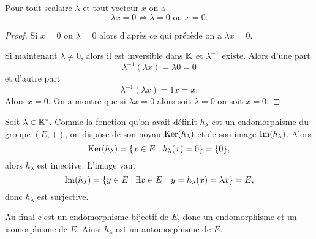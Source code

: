 \begin{prop}
  Pour tout scalaire \(\lambda\) et tout vecteur \(x\) on a
  \begin{equation}
    \lambda x = 0 \iff \lambda = 0 \text{~ou~} x=0.
  \end{equation}
\end{prop}
\begin{proof}
  Si \(x=0\) ou \(\lambda=0\) alors d'après ce qui précède on a \(\lambda x=0\).

  Si maintenant \(\lambda \neq 0\), alors il est inversible dans \(\mathbb{K}\) et 
  \(\lambda^{-1}\) existe. Alors d'une part
  \begin{equation}
    \lambda^{-1}(\lambda x)=\lambda 0 =0
  \end{equation}
  et d'autre part
  \begin{equation}
    \lambda^{-1}(\lambda x)=1 x=x.
  \end{equation}
  Alors \(x=0\). On a montré que si \(\lambda x=0\) alors soit \(\lambda=0\) ou 
  soit \(x=0\).
\end{proof}

Soit \(\lambda \in \mathbb{K}^*\). Comme la fonction qu'on avait définit \(h_\lambda\) 
est un endomorphisme du groupe \((E,+)\), on dispose de son noyau 
\(\operatorname{Ker}(h_\lambda)\) et de son image \(\operatorname{Im}(h_\lambda)\). Alors
\begin{equation}
  \operatorname{Ker}(h_\lambda)=\left\{x \in E\mathrel{}\middle|\mathrel{}h_\lambda(x)=0\right\}=\{0\},
\end{equation}
alors \(h_\lambda\) est injective. L'image vaut
\begin{equation}
  \operatorname{Im}(h_\lambda)=\left\{y \in E\mathrel{}\middle|\mathrel{}\exists x \in E \quad y=h_\lambda(x)=\lambda 
  x\right\} = E,
\end{equation}
donc \(h_\lambda\) est surjective.

Au final c'est un endomorphisme bijectif de \(E\), donc un endomorphisme et un 
isomorphisme de \(E\). Ainsi \(h_\lambda\) est un automorphisme de \(E\).

